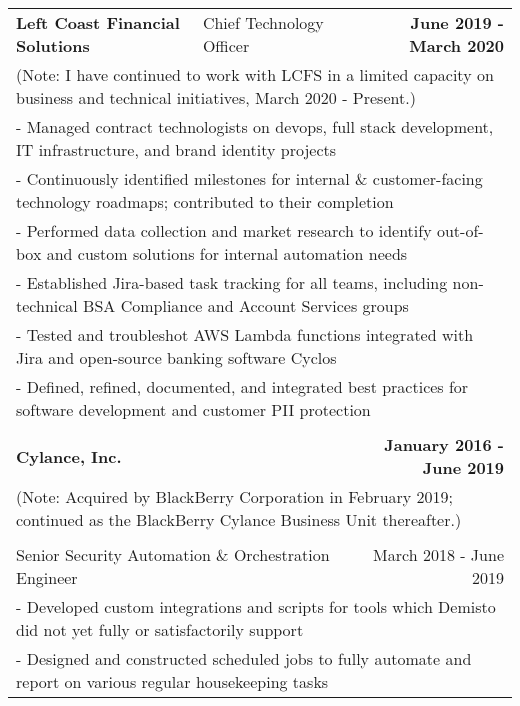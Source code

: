 \documentclass[letterpaper]{article}
\begin{document}
\begin{center}
\begin{tabular}{p{}p{}r}
				\textbf{Left Coast Financial Solutions} &
				\quad\quad\quad\quad\quad Chief Technology Officer &
				\textbf{June 2019 - March 2020\quad}
			\\
				\multicolumn{3}{p{\textwidth}}{(Note: I have continued to work with LCFS in a limited capacity on business and technical initiatives, March 2020 - Present.)}
			\\
				\multicolumn{3}{p{\textwidth}}{\quad\quad - Managed contract technologists on devops, full stack development, IT infrastructure, and brand identity projects} 
			\\
				\multicolumn{3}{p{\textwidth}}{\quad\quad - Continuously identified milestones for internal \& customer-facing technology roadmaps; contributed to their completion} 
			\\
				\multicolumn{3}{p{\textwidth}}{\quad\quad - Performed data collection and market research to identify out-of-box and custom solutions for internal automation needs}  
			\\
				\multicolumn{3}{p{\textwidth}}{\quad\quad - Established Jira-based task tracking for all teams, including non-technical BSA Compliance and Account Services groups}
			\\
				\multicolumn{3}{p{\textwidth}}{\quad\quad - Tested and troubleshot AWS Lambda functions integrated with Jira and open-source banking software Cyclos} 
			\\
				\multicolumn{3}{p{\textwidth}}{\quad\quad - Defined, refined, documented, and integrated best practices for software development and customer PII protection}
			\\
			\\
				\textbf{Cylance, Inc.} & &
				\textbf{January 2016 - June 2019\quad}
			\\		%
				\multicolumn{3}{p{\textwidth}}{(Note: Acquired by BlackBerry Corporation in February 2019; continued as the BlackBerry Cylance Business Unit thereafter.)}
			\\
			\\
				\multicolumn{2}{p{0.5\textwidth}}{\quad Senior Security Automation \& Orchestration Engineer}
				&
				{March 2018 - June 2019 \quad\quad\quad\quad}
			\\
				\multicolumn{3}{p{\textwidth}}{\quad\quad - Developed custom integrations and scripts for tools which Demisto did not yet fully or satisfactorily support}
			\\
				\multicolumn{3}{p{\textwidth}}{\quad\quad - Designed and constructed scheduled jobs to fully automate and report on various regular housekeeping tasks}

\end{tabular}
\end{center}
\end{document}
